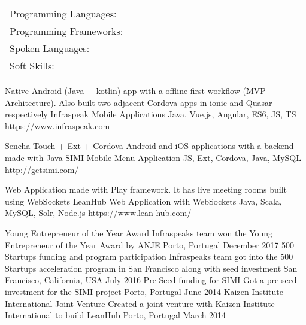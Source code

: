 \documentclass[]{awesome-cv}
\begin{document}
\vspace{-2mm}
\begin{cventries}
	\cventry
	{}
	{\def\arraystretch{1.15}{\begin{tabular}{ l l }
		Programming Languages:  & {\skill{ Java, JavaScript, Perl, SQL, PHP, Kotlin, C++, C}} \\
		Programming Frameworks:  & {\skill{ Android, ionic, jQuery, Laravel, Vue.js, Quasar, Play Framework}} \\
		Spoken Languages:  & {\skill{ English, Portuguese, French, Spanish, Slovene}} \\
		Soft Skills:  & {\skill{ Ability to Work Under Pressure, Self-motivation, Creativity, Good communication}} \\
		\end{tabular}}}
	{}
	{}
	{}
\end{cventries}

\vspace{-7mm}
\begin{cventries}
	\cventry
	{Native Android (Java + kotlin) app with a offline first workflow (MVP Architecture). Also built two adjacent Cordova apps in ionic and Quasar respectively}
	{Infraspeak Mobile Applications}
	{Java, Vue.js, Angular, ES6, JS, TS}
	{https://www.infraspeak.com}
	{}
	
	\vspace{-5mm}
	\cventry
	{Sencha Touch + Ext + Cordova Android and iOS applications with a backend made with Java}
	{SIMI Mobile Menu Application}
	{JS, Ext, Cordova, Java, MySQL}
	{http://getsimi.com/}
	{}
	
	\vspace{-5mm}
	\cventry
	{Web Application made with Play framework. It has live meeting rooms built using WebSockets}
	{LeanHub Web Application with WebSockets}
	{Java, Scala, MySQL, Solr, Node.js}
	{https://www.lean-hub.com/}
	{}
	
	\vspace{-5mm}
\end{cventries}
\begin{cvhonors}
	\cvhonor
	{Young Entrepreneur of the Year Award}
	{Infraspeak\textquotesingle{}s team won the Young Entrepreneur of the Year Award by ANJE}
	{Porto, Portugal}
	{December 2017}
	\cvhonor
	{500 Startups funding and program participation}
	{Infraspeak\textquotesingle{}s team got into the 500 Startups acceleration program in San Francisco along with seed investment}
	{San Francisco, California, USA}
	{July 2016}
	\cvhonor
	{Pre-Seed funding for SIMI}
	{Got a pre-seed investment for the SIMI project}
	{Porto, Portugal}
	{June 2014}
	\cvhonor
	{Kaizen Institute International Joint-Venture}
	{Created a joint venture with Kaizen Institute International to build LeanHub}
	{Porto, Portugal}
	{March 2014}
\end{cvhonors}
\ 
\end{document}
